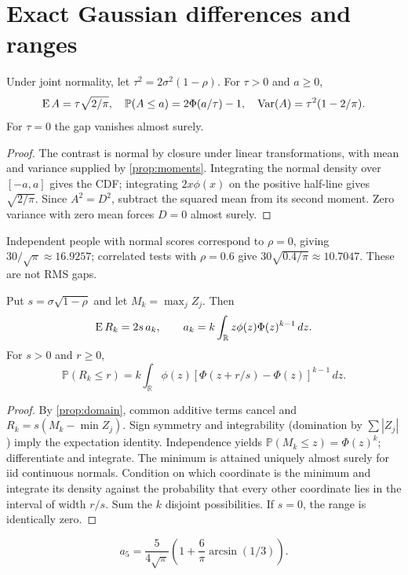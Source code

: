 \chapter{Exact Gaussian differences and ranges}
\begin{proposition}\label{prop:gap}
Under joint normality, let $\tau^2=2\sigma^2(1-\rho)$.
For $\tau>0$ and $a\ge0$,
\[
\operatorname{E} A=\tau\sqrt{2/\pi},\quad
\mathbb{P}(A\le a)=2\Phi(a/\tau)-1,\quad
\operatorname{Var}(A)=\tau^2(1-2/\pi).
\]
For $\tau=0$ the gap vanishes almost surely.
\end{proposition}
\begin{proof}
The contrast is normal by closure under linear transformations, with
mean and variance supplied by \cref{prop:moments}.
Integrating the normal density over $[-a,a]$ gives the CDF; integrating
$2x\phi(x)$ on the positive half-line gives $\sqrt{2/\pi}$.
Since $A^2=D^2$, subtract the squared mean from its second moment.
Zero variance with zero mean forces $D=0$ almost surely.
\end{proof}
Independent people with normal scores correspond to $\rho=0$, giving
$30/\sqrt{\pi}\approx16.9257$; correlated tests with $\rho=0.6$
give $30\sqrt{0.4/\pi}\approx10.7047$. These are not RMS gaps.
\begin{proposition}\label{prop:range}
Put $s=\sigma\sqrt{1-\rho}$ and let $M_k=\max_j Z_j$. Then
\[
\operatorname{E} R_k=2s\,a_k,\qquad a_k=k\int_{\mathbb R}z\phi(z)\Phi(z)^{k-1}\,dz.
\]
For $s>0$ and $r\ge0$,
\[
\mathbb{P}(R_k\le r)=k\int_{\mathbb R}\phi(z)
[\Phi(z+r/s)-\Phi(z)]^{k-1}\,dz.
\]
\end{proposition}
\begin{proof}
By \cref{prop:domain}, common additive terms cancel and $R_k=s(M_k-\min Z_j)$.
Sign symmetry and integrability (domination by $\sum |Z_j|$) imply the
expectation identity. Independence yields $\mathbb{P}(M_k\le z)=\Phi(z)^k$;
differentiate and integrate. The minimum is attained uniquely almost
surely for iid continuous normals. Condition on which coordinate is the
minimum and integrate its density against the probability that every other
coordinate lies in the interval of width $r/s$. Sum the $k$ disjoint
possibilities. If $s=0$, the range is identically zero.
\end{proof}
\begin{proposition}\label{prop:five}
\[
a_5=\frac5{4\sqrt{\pi}}
\left(1+\frac6\pi\arcsin(1/3)\right).
\]
\end{proposition}
